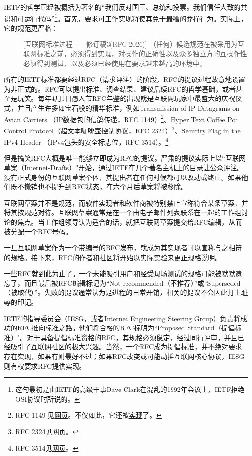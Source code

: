 \documentclass[12pt,oneside]{book}
\begin{document}
IETF的哲学已经被概括为著名的“我们反对国王、总统和投票。我们信任大致的共识和可运行代码”\footnote{这句最初是由IETF的高级干事Dave Clark在混乱的1992年会议上，IETF拒绝OSI协议时所说的。}。首先，要求可工作实现将使其免于最糟的莽撞行为。实际上，它的规范更严格：

\begin{quote}[互联网标准过程——修订稿3(RFC 2026)]
（任何）候选规范在被采用为互联网标准之前，必须得到实现，对操作的正确性以及众多独立方的互操作性必须得到测试，以及必须已经使用在要求越来越高的环境中。
\end{quote}
    
所有的IETF标准都要经过RFC（请求评注）的阶段。RFC的提议过程故意地设置为非正式的。RFC可以提出标准、调查结果、建议后续RFC的哲学基础，或者甚至是玩笑。每年4月1日愚人节RFC年鉴的出现就是互联网玩家中最盛大的庆祝仪式，并且产生许多如宝石般的精华标准，例如Transmission of IP Datagrams on Avian Carriers （IP数据包的信鸽传递，RFC 1149）\footnote{RFC 1149 见\href{http://www.ietf.org/rfc/rfc1149.txt}{网页}。不仅如此，它还被\href{http://www.blug.linux.no/rfc1149/writeup.html}{实现}了。}、Hyper Text Coffee Pot Control Protocol（超文本咖啡壶控制协议，RFC 2324）\footnote{RFC 2324见\href{http://www.ietf.org/rfc/rfc2324.txt}{网页}。}、Security Flag in the IPv4 Header （IPv4包头的安全标志位，RFC 3514）。\footnote{RFC 3514见\href{http://www.ietf.org/rfc/rfc3514.txt}{网页}。}

但是搞笑RFC大概是唯一能够立即成为RFC的提议。严肃的提议实际上以“互联网草案（Internet-Drafts）"开始，通过IETF在几个著名主机上的目录让公众评注。没有正式身份的互联网草案个体，其提出者在任何时候都可以改动或终止。如果他们既不撤销也不提升到RFC状态，在六个月后草案将被移除。

互联网草案并不是规范，而软件实现者和软件商被特别禁止宣称符合某条草案，并将其按规范对待。互联网草案通常是在一个由电子邮件列表联系在一起的工作组讨论的焦点。当工作组领导认为适合的话，就把互联网草案提交给RFC编辑，从而被分配一个RFC号码。

一旦互联网草案作为一个带编号的RFC发布，就成为其实现者可以宣称与之相符的规格。接下来，RFC的作者和社区将开始以实际实验来更正规格说明。

一些RFC就到此为止了。一个未能吸引用户和经受现场测试的规格可能被默默遗忘了，而且最后被RFC编辑标记为“Not recommended（不推荐）”或“Superseded（被取代）”。失败的提议通常认为是进程的日常开销，相关的提议不会因此打上耻辱的印记。

IETF的指导委员会（IESG，或者Internet Engineering Steering Group）负责将成功的RFC推向标准之路。他们将合格的RFC标明为“Proposed Standard（提倡标准）"。对于具备提倡标准资格的RFC，其规格必须稳定，经过同行评审，并且已经吸引了互联网社区的极大兴趣。当然，一个RFC成为提倡标准，并不绝对要求存在实现，如果有则最好不过；如果RFC改变或可能动摇互联网核心协议，IESG则有权要求RFC提供实现。
\end{document}
